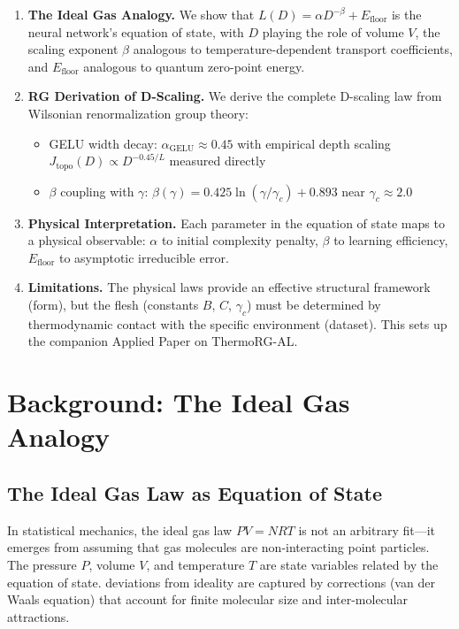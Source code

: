 \documentclass[11pt, a4paper]{article}
\theoremstyle{plain}
\begin{document}
\begin{enumerate}
\item \textbf{The Ideal Gas Analogy.} We show that $L(D) = \alpha D^{-\beta} + E_{\mathrm{floor}}$ is the neural network's equation of state, with $D$ playing the role of volume $V$, the scaling exponent $\beta$ analogous to temperature-dependent transport coefficients, and $E_{\mathrm{floor}}$ analogous to quantum zero-point energy.

\item \textbf{RG Derivation of D-Scaling.} We derive the complete D-scaling law from Wilsonian renormalization group theory:
    \begin{itemize}
    \item GELU width decay: $\alpha_{\mathrm{GELU}} \approx 0.45$ with empirical depth scaling $J_{\mathrm{topo}}(D) \propto D^{-0.45/L}$ measured directly
    \item $\beta$ coupling with $\gamma$: $\beta(\gamma) = 0.425\ln(\gamma/\gamma_c) + 0.893$ near $\gamma_c \approx 2.0$
    \end{itemize}

\item \textbf{Physical Interpretation.} Each parameter in the equation of state maps to a physical observable: $\alpha$ to initial complexity penalty, $\beta$ to learning efficiency, $E_{\mathrm{floor}}$ to asymptotic irreducible error.

\item \textbf{Limitations.} The physical laws provide an effective structural framework (form), but the flesh (constants $B$, $C$, $\gamma_c$) must be determined by thermodynamic contact with the specific environment (dataset). This sets up the companion Applied Paper on ThermoRG-AL.
\end{enumerate}

\section{Background: The Ideal Gas Analogy}

\subsection{The Ideal Gas Law as Equation of State}

In statistical mechanics, the ideal gas law $PV = NRT$ is not an arbitrary fit---it emerges from assuming that gas molecules are non-interacting point particles. The pressure $P$, volume $V$, and temperature $T$ are state variables related by the equation of state. deviations from ideality are captured by corrections (van der Waals equation) that account for finite molecular size and inter-molecular attractions.
\end{document}
